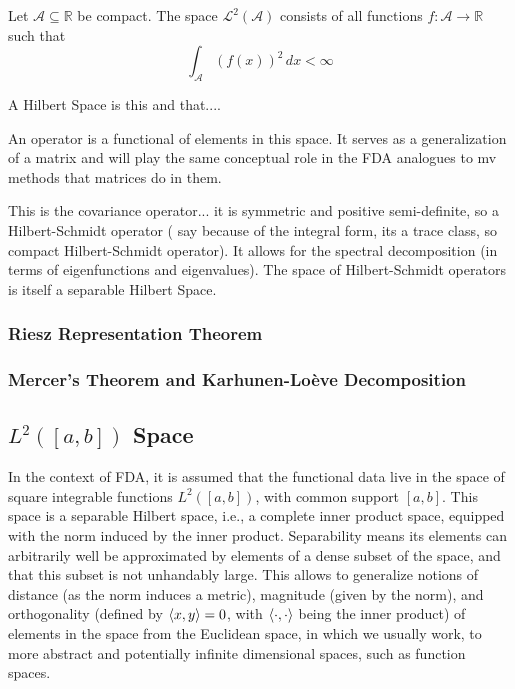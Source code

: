\begin{definition}
    Let $\mathcal{A} \subseteq \mathbb{R}$ be compact. The space \( \mathcal{L}^2(\mathcal{A}) \)
    consists of all functions \( f: \mathcal{A} \to \mathbb{R} \) such that
    \[
    \int_{\mathcal{A}} (f(x))^2 \, dx < \infty
    \]
\end{definition}

A Hilbert Space is this and that....

An operator is a functional of elements in this space. It serves as a generalization of
a matrix and will play the same conceptual role in the FDA analogues to mv methods
that matrices do in them.

This is the covariance operator... it is symmetric and positive semi-definite, so
a Hilbert-Schmidt operator (\textcite{WangChiouMüller2016} say because of the integral form,
its a trace class, so compact Hilbert-Schmidt operator). It allows for the spectral
decomposition (in terms of eigenfunctions and eigenvalues). The space of Hilbert-Schmidt
operators is itself a separable Hilbert Space.

\subsubsection{Riesz Representation Theorem}
\label{sec:riesz}

\subsubsection{Mercer's Theorem and Karhunen-Loève Decomposition}
\label{sec:mercer and kh}

\subsection{$L^2([a, b])$ Space}
\label{sec:l2 space}
In the context of FDA, it is assumed that the functional data live in
the space of square integrable functions $L^2([a,b])$, with common
support $[a,b]$. This space is a separable Hilbert space, i.e., a complete inner
product space, equipped with the norm induced by the inner product. Separability means
its elements can arbitrarily well be approximated by elements of a dense subset of the
space, and that this subset is not unhandably large.
This allows to generalize notions of distance (as the norm induces a
metric), magnitude (given by the norm), and orthogonality (defined by
$\left \langle x, y \right \rangle = 0$, with $\left \langle \cdot, \cdot \right \rangle$ being the inner product) of elements
in the space from the Euclidean space, in which we usually work, to more
abstract and potentially infinite dimensional spaces, such as function
spaces.

